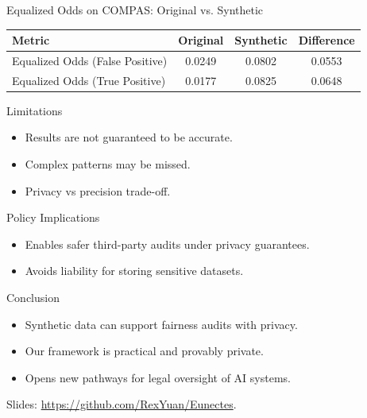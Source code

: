 \documentclass{beamer}
\begin{document}
\begin{frame}{Equalized Odds on COMPAS: Original vs. Synthetic}
  \centering
  \begin{tabular}{|l|c|c|c|}
    \hline
    \textbf{Metric} & \textbf{Original} & \textbf{Synthetic} & \textbf{Difference} \\
    \hline
    Equalized Odds (False Positive) & 0.0249 & 0.0802 & 0.0553 \\
    Equalized Odds (True Positive)  & 0.0177 & 0.0825 & 0.0648 \\
    \hline
  \end{tabular}
\end{frame}

\begin{frame}{Limitations}
  \begin{itemize}
    \item Results are not guaranteed to be accurate.
    \item Complex patterns may be missed.
    \item Privacy vs precision trade-off.
  \end{itemize}
\end{frame}

\begin{frame}{Policy Implications}
  \begin{itemize}
    \item Enables safer third-party audits under privacy guarantees.
    \item Avoids liability for storing sensitive datasets.
  \end{itemize}
\end{frame}

\begin{frame}{Conclusion}
  \begin{itemize}
    \item Synthetic data can support fairness audits with privacy.
    \item Our framework is practical and provably private.
    \item Opens new pathways for legal oversight of AI systems.
  \end{itemize}

  Slides: \url{https://github.com/RexYuan/Eunectes}.
\end{frame}
\end{document}
